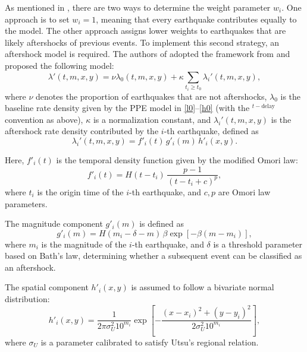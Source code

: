 \documentclass[linenum,doublespace,onecolumn]{SSA-SRL}
\theoremstyle{lemma}
\begin{document}
As mentioned in \cite{RE}, there are two ways to determine the weight parameter $w_i$. One approach is to set $w_i = 1$, meaning that every earthquake contributes equally to the model. The other approach assigns lower weights to earthquakes that are likely aftershocks of previous events. To implement this second strategy, an aftershock model is required. The authors of \cite{RE} adopted the framework from \cite{CM,Ogata1,Ogata2,Ogata3} and proposed the following model:
\begin{equation}\label{l'tmxy}
    \lambda'(t,m,x,y) = \nu \lambda_0(t,m,x,y) + \kappa \sum_{t_i \geq t_0} \lambda_i'(t,m,x,y),
\end{equation}
where $\nu$ denotes the proportion of earthquakes that are not aftershocks, $\lambda_0$ is the baseline rate density given by the PPE model in \eqref{l0}--\eqref{h0} (with the ${}^{t-\text{delay}}$ convention as above), $\kappa$ is a normalization constant, and $\lambda_i'(t,m,x,y)$ is the aftershock rate density contributed by the $i$-th earthquake, defined as
\begin{equation}\label{l'itmxy}
    \lambda_i'(t,m,x,y) = f'_i(t)\, g'_i(m)\, h'_i(x,y).
\end{equation}

Here, $f'_i(t)$ is the temporal density function given by the modified Omori law:
\begin{equation}\label{f2it}
    f'_i(t) = H(t - t_i)\, \frac{p - 1}{(t - t_i + c)^p},
\end{equation}
where $t_i$ is the origin time of the $i$-th earthquake, and $c, p$ are Omori law parameters.  

The magnitude component $g'_i(m)$ is defined as
\begin{equation}\label{g2im}
    g'_i(m) = H(m_i - \delta - m)\, \beta \exp\left[ -\beta (m - m_i) \right],
\end{equation}
where $m_i$ is the magnitude of the $i$-th earthquake, and $\delta$ is a threshold parameter based on Bath’s law, determining whether a subsequent event can be classified as an aftershock.  

The spatial component $h'_i(x,y)$ is assumed to follow a bivariate normal distribution:
\begin{equation}\label{h2ixy}
    h'_i(x,y) = \frac{1}{2\pi \sigma_U^2 10^{m_i}} \exp\left[ -\frac{(x - x_i)^2 + (y - y_i)^2}{2 \sigma_U^2 10^{m_i}} \right],
\end{equation}
where $\sigma_U$ is a parameter calibrated to satisfy Utsu’s regional relation.
\end{document}
